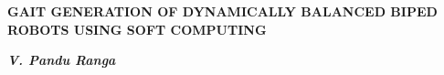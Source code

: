 \begin{center}
{\Large \bf GAIT GENERATION OF DYNAMICALLY BALANCED BIPED ROBOTS USING SOFT COMPUTING} 
\end{center}
\vspace{210mm}
\large
\begin{flushright}
{\bf \em V. Pandu Ranga}  
\end{flushright}




